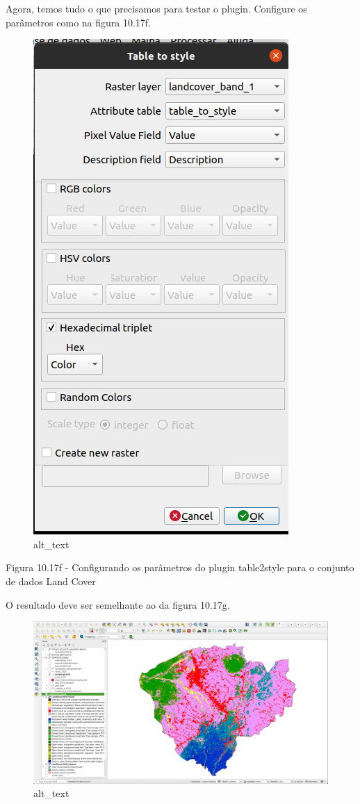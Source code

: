 \documentclass[
]{book}
\begin{document}
Agora, temos tudo o que precisamos para testar o plugin. Configure os parâmetros como na figura 10.17f.

\begin{figure}
\centering
\includegraphics{media/modulo10/fig1017_f.png}
\caption{alt\_text}
\end{figure}

Figura 10.17f - Configurando os parâmetros do plugin table2style para o conjunto de dados Land Cover

O resultado deve ser semelhante ao da figura 10.17g.

\begin{figure}
\centering
\includegraphics{media/modulo10/fig1017_g.png}
\caption{alt\_text}
\end{figure}
\end{document}
